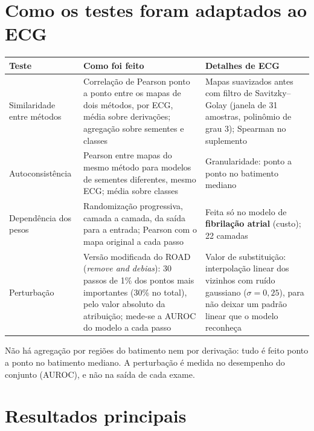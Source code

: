 \documentclass[11pt,a4paper]{article}
\begin{document}
\section{Como os testes foram adaptados ao ECG}
\begin{center}\small
\begin{tabularx}{\linewidth}{p{2.6cm}XX}
\toprule
\textbf{Teste} & \textbf{Como foi feito} & \textbf{Detalhes de ECG} \\
\midrule
Similaridade entre métodos & Correlação de Pearson ponto a ponto entre os mapas de dois métodos, por ECG, média sobre derivações; agregação sobre sementes e classes & Mapas suavizados antes com filtro de Savitzky--Golay (janela de 31 amostras, polinômio de grau 3); Spearman no suplemento \\ \addlinespace
Autoconsistência & Pearson entre mapas do mesmo método para modelos de sementes diferentes, mesmo ECG; média sobre classes & Granularidade: ponto a ponto no batimento mediano \\ \addlinespace
Dependência dos pesos & Randomização progressiva, camada a camada, da saída para a entrada; Pearson com o mapa original a cada passo & Feita só no modelo de \textbf{fibrilação atrial} (custo); 22 camadas \\ \addlinespace
Perturbação & Versão modificada do ROAD (\textit{remove and debias}): 30 passos de 1\% dos pontos mais importantes (30\% no total), pelo valor absoluto da atribuição; mede-se a AUROC do modelo a cada passo & Valor de substituição: interpolação linear dos vizinhos com ruído gaussiano ($\sigma = 0{,}25$), para não deixar um padrão linear que o modelo reconheça \\
\bottomrule
\end{tabularx}
\end{center}
Não há agregação por regiões do batimento nem por derivação: tudo é feito ponto a ponto no batimento mediano. A perturbação é medida no desempenho do conjunto (AUROC), e não na saída de cada exame.

\section{Resultados principais}
\end{document}
